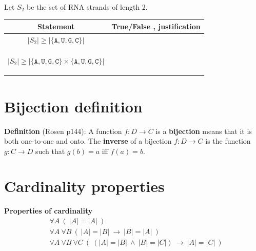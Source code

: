 \documentclass[12pt, oneside]{article}
\newcommand{\A}[0]{\texttt{A}}
\newcommand{\C}[0]{\texttt{C}}
\newcommand{\G}[0]{\texttt{G}}
\newcommand{\U}[0]{\texttt{U}}
\begin{document}
Let $S_2$ be the set of RNA strands of length 2.

\vspace{-20pt}

\begin{center}
\begin{tabular}{|c|p{5in}|}
\hline
Statement  &  True/False , justification \\
\hline
$ |S_2 | \geq | \{\A,\U,\G,\C\} |$ &  \\
&\\&\\&\\
\hline
$ |S_2 | \geq | \{\A,\U,\G,\C\} \times \{\A, \U, \G,\C\} |$ &  \\
&\\&\\&\\
\hline
\end{tabular}
\end{center} \vfill
\section*{Bijection definition}


{\bf Definition}  (Rosen p144): A function $f: D  \to C$ is a {\bf bijection} means that it is both  one-to-one  and onto.
The {\bf inverse} of a  bijection $f: D  \to  C$ is  the function $g: C  \to  D$  such that $g(b) = a$ iff  $f(a) =  b$.


 \vfill
\section*{Cardinality properties}


{\bf Properties of cardinality}
\begin{align*}
&\forall A ~ (~  |A| = |A| ~)\\
&\forall A ~ \forall B ~(~ |A| = |B|  ~\to ~ |B| = |A|~)\\
&\forall A ~ \forall B ~ \forall C~ (~ (|A| = |B| ~\wedge~ |B| = |C|) ~\to ~ |A| = |C|~)
\end{align*}
\end{document}
